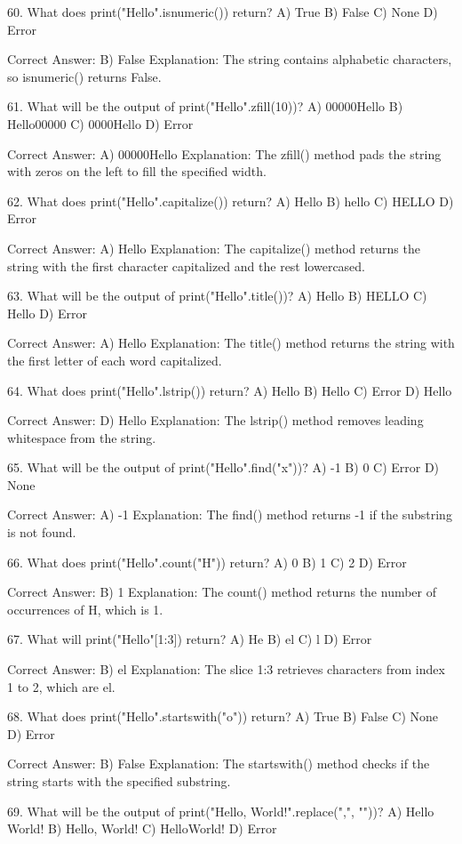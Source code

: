 60. What does print("Hello".isnumeric()) return?
A) True
B) False
C) None
D) Error

Correct Answer: B) False
Explanation: The string contains alphabetic characters, so isnumeric() returns False.

61. What will be the output of print("Hello".zfill(10))?
A) 00000Hello
B) Hello00000
C) 0000Hello
D) Error

Correct Answer: A) 00000Hello
Explanation: The zfill() method pads the string with zeros on the left to fill the specified width.

62. What does print("Hello".capitalize()) return?
A) Hello
B) hello
C) HELLO
D) Error

Correct Answer: A) Hello
Explanation: The capitalize() method returns the string with the first character capitalized and the rest lowercased.

63. What will be the output of print("Hello".title())?
A) Hello
B) HELLO
C) Hello
D) Error

Correct Answer: A) Hello
Explanation: The title() method returns the string with the first letter of each word capitalized.

64. What does print("Hello".lstrip()) return?
A) Hello
B) Hello
C) Error
D) Hello

Correct Answer: D) Hello
Explanation: The lstrip() method removes leading whitespace from the string.

65. What will be the output of print("Hello".find("x"))?
A) -1
B) 0
C) Error
D) None

Correct Answer: A) -1
Explanation: The find() method returns -1 if the substring is not found.

66. What does print("Hello".count("H")) return?
A) 0
B) 1
C) 2
D) Error

Correct Answer: B) 1
Explanation: The count() method returns the number of occurrences of H, which is 1.

67. What will print("Hello"[1:3]) return?
A) He
B) el
C) l
D) Error

Correct Answer: B) el
Explanation: The slice 1:3 retrieves characters from index 1 to 2, which are el.

68. What does print("Hello".startswith("o")) return?
A) True
B) False
C) None
D) Error

Correct Answer: B) False
Explanation: The startswith() method checks if the string starts with the specified substring.

69. What will be the output of print("Hello, World!".replace(",", ""))?
A) Hello World!
B) Hello, World!
C) HelloWorld!
D) Error

